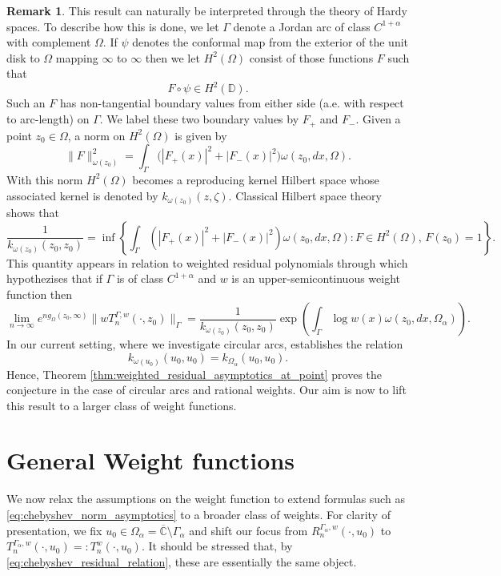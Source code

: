 \documentclass[12pt,oneside,reqno]{amsart}
\theoremstyle{definition}
\newtheorem*{remark}{Remark}
\numberwithin{equation}{section}
\newcommand{\C}{{\mathbb C}}
\newcommand{\bbD}{\mathbb{D}}
\begin{document}
\begin{remark}
This result can naturally be interpreted through the theory of Hardy spaces. To describe how this is done, we let \(\Gamma\) denote a Jordan arc of class \(C^{1+\alpha}\) with complement \(\Omega\). If \(\psi\) denotes the conformal map from the exterior of the unit disk to \(\Omega\) mapping \(\infty\) to \(\infty\) then we let \(H^2(\Omega)\) consist of those functions \(F\) such that
\[F\circ \psi\in H^2(\bbD).\]
Such an \(F\) has non-tangential boundary values from either side (a.e. with respect to arc-length) on \(\Gamma\). We label these two boundary values by \(F_+\) and \(F_-\). Given a point \(z_0\in \Omega\), a norm on \(H^2(\Omega)\) is given by
\[\|F\|_{\omega(z_0)}^2= \int_{\Gamma}\bigl(|F_+(x)|^2+|F_-(x)|^2\bigr) \omega(z_0,dx,\Omega).\]
With this norm \(H^2(\Omega)\) becomes a reproducing kernel Hilbert space whose associated kernel is denoted by \(k_{\omega(z_0)}(z,\zeta)\). Classical Hilbert space theory shows that
\[\frac{1}{k_{\omega(z_0)}(z_0,z_0)} = \inf\left\{\int_{\Gamma}(|F_+(x)|^2+|F_-(x)|^2)\omega(z_0,dx,\Omega): F\in H^2(\Omega),\, F(z_0) = 1\right\}.\]
This quantity appears in relation to weighted residual polynomials through \cite[Conjecture 1.7]{buchecker-eichinger-zinchenko25} which hypothezises that if \(\Gamma\) is of class \(C^{1+\alpha}\) and \(w\) is an upper-semicontinuous weight function then
\[\lim_{n\rightarrow \infty}e^{ng_{\Omega}(z_0,\infty)}\|wT_n^{\Gamma,w}(\cdot,z_0)\|_{\Gamma} = \frac{1}{k_{\omega(z_0)}(z_0,z_0)}\exp\left(\int_{\Gamma}\log w(x)\omega(z_0,dx,\Omega_\alpha)\right).\]
In our current setting, where we investigate circular arcs, \cite[Theorem 5.4.10]{buchecker25} establishes the relation 
\[k_{\omega(u_0)}(u_0,u_0) = k_{\Omega_\alpha}(u_0,u_0).\]
Hence, Theorem \ref{thm:weighted_residual_asymptotics_at_point} proves the conjecture in the case of circular arcs and rational weights. Our aim is now to lift this result to a larger class of weight functions.
\end{remark}



\section{General Weight functions}
\label{sec:general_weight}
We now relax the assumptions on the weight function to extend formulas such as \eqref{eq:chebyshev_norm_asymptotics} to a broader class of weights. For clarity of presentation, we fix $u_0\in \Omega_\alpha=\overline{\C}\setminus \Gamma_\alpha$ and shift our focus from \(R_n^{\Gamma_\alpha,w}(\cdot,u_0)\) to \(T_n^{\Gamma_\alpha,w}(\cdot,u_0)=:T_n^{w}(\cdot,u_0)\). It should be stressed that, by \eqref{eq:chebyshev_residual_relation}, these are essentially the same object. 
\end{document}
